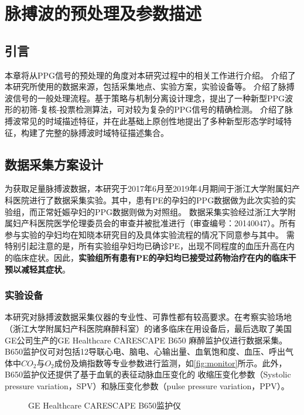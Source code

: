 \chapter{脉搏波的预处理及参数描述}
\section{引言}
本章将从PPG信号的预处理的角度对本研究过程中的相关工作进行介绍。
介绍了本研究所使用的数据来源，包括采集地点、实验方案，实验设备等。
介绍了脉搏波信号的一般处理流程。基于策略与机制分离设计理念，提出了一种新型PPG波形的初筛-复核-投票检测算法，可对较为复杂的PPG信号的精确检测。
介绍了脉搏波常见的时域描述特征，并在此基础上原创性地提出了多种新型形态学时域特征，构建了完整的脉搏波时域特征描述集合。
\section{数据采集方案设计}
为获取足量脉搏波数据，本研究于2017年6月至2019年4月期间于浙江大学附属妇产科医院进行了数据采集实验。其中，患有PE的孕妇的PPG数据做为此次实验的实验组，而正常妊娠孕妇的PPG数据则做为对照组。
数据采集实验经过浙江大学附属妇产科医院医学伦理委员会的审查并被批准进行（审查编号：20140047）。所有参与实验的孕妇均在知晓本研究目的及具体实验流程的情况下同意参与其中。
需特别引起注意的是，所有实验组孕妇均已确诊PE，出现不同程度的血压升高在内的临床症状。因此，\textbf{实验组所有患有PE的孕妇均已接受过药物治疗在内的临床干预以减轻其症状}。
\subsection{实验设备}
本研究对脉搏波数据采集仪器的专业性、可靠性都有较高要求。在考察实验场地（浙江大学附属妇产科医院麻醉科室）的诸多临床在用设备后，最后选取了美国GE公司生产的GE Healthcare CARESCAPE B650 麻醉监护仪进行数据采集。
B650监护仪可对包括12导联心电、脑电、心输出量、血氧饱和度、血压、呼出气体中$CO_{2}$与$O_{2}$成份及熵指数等专业参数进行监测，如\autoref{fig:monitor}所示。此外，B650监护仪还提供了基于血氧的表征动脉血压变化的
收缩压变化参数（Systolic pressure variation，SPV）和脉压变化参数（pulse pressure variation，PPV）\cite{GE2021,Michard1999}。
\begin{figure}[htbp]
      \centering
      \quad
      \caption{\label{fig:monitor}GE Healthcare CARESCAPE B650监护仪}
\end{figure}
